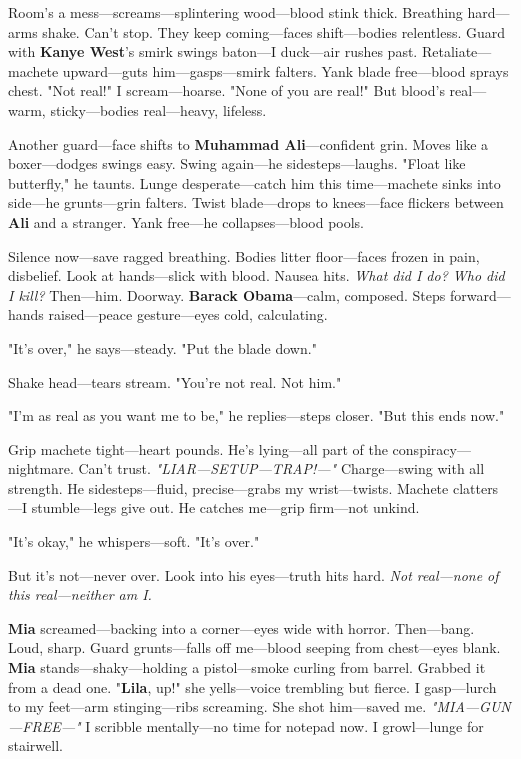 \documentclass{article}
\begin{document}
Room’s a mess—screams—splintering wood—blood stink thick. Breathing hard—arms shake. Can’t stop. They keep coming—faces shift—bodies relentless. Guard with \textbf{Kanye West}’s smirk swings baton—I duck—air rushes past. Retaliate—machete upward—guts him—gasps—smirk falters. Yank blade free—blood sprays chest. "Not real!" I scream—hoarse. "None of you are real!" But blood’s real—warm, sticky—bodies real—heavy, lifeless.

Another guard—face shifts to \textbf{Muhammad Ali}—confident grin. Moves like a boxer—dodges swings easy. Swing again—he sidesteps—laughs. "Float like butterfly," he taunts. Lunge desperate—catch him this time—machete sinks into side—he grunts—grin falters. Twist blade—drops to knees—face flickers between \textbf{Ali} and a stranger. Yank free—he collapses—blood pools.

Silence now—save ragged breathing. Bodies litter floor—faces frozen in pain, disbelief. Look at hands—slick with blood. Nausea hits. \textit{What did I do? Who did I kill?} Then—him. Doorway. \textbf{Barack Obama}—calm, composed. Steps forward—hands raised—peace gesture—eyes cold, calculating.

"It’s over," he says—steady. "Put the blade down."

Shake head—tears stream. "You’re not real. Not him."

"I’m as real as you want me to be," he replies—steps closer. "But this ends now."

Grip machete tight—heart pounds. He’s lying—all part of the conspiracy—nightmare. Can’t trust. \textit{"LIAR—SETUP—TRAP!—"} Charge—swing with all strength. He sidesteps—fluid, precise—grabs my wrist—twists. Machete clatters—I stumble—legs give out. He catches me—grip firm—not unkind.

"It’s okay," he whispers—soft. "It’s over."

But it’s not—never over. Look into his eyes—truth hits hard. \textit{Not real—none of this real—neither am I.}

\textbf{Mia} screamed—backing into a corner—eyes wide with horror. Then—bang. Loud, sharp. Guard grunts—falls off me—blood seeping from chest—eyes blank. \textbf{Mia} stands—shaky—holding a pistol—smoke curling from barrel. Grabbed it from a dead one. "\textbf{Lila}, up!" she yells—voice trembling but fierce. I gasp—lurch to my feet—arm stinging—ribs screaming. She shot him—saved me. \textit{"MIA—GUN—FREE—"} I scribble mentally—no time for notepad now. I growl—lunge for stairwell.
\end{document}
